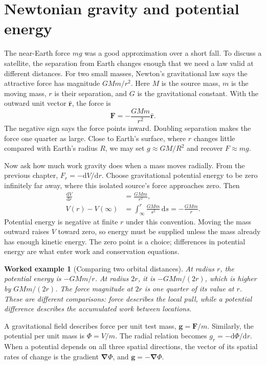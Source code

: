 \documentclass[11pt,oneside]{book}
\newcommand{\dd}{\mathrm{d}}
\newcommand{\vect}[1]{\boldsymbol{#1}}
\newcommand{\grad}{\boldsymbol{\nabla}}
\newcommand{\od}[2]{\frac{\dd #1}{\dd #2}}
\theoremstyle{reviewstyle}
\newtheorem{example}{Worked example}[chapter]
\begin{document}
\section{Newtonian gravity and potential energy}
The near-Earth force $mg$ was a good approximation over a short fall. To discuss a satellite, the separation from Earth changes enough that we need a law valid at different distances. For two small masses, Newton's gravitational law says the attractive force has magnitude $GMm/r^2$. Here $M$ is the source mass, $m$ is the moving mass, $r$ is their separation, and $G$ is the gravitational constant. With the outward unit vector $\hat{\vect r}$, the force is
\begin{equation}
\vect F=-\frac{GMm}{r^2}\hat{\vect r}.
\end{equation}
The negative sign says the force points inward. Doubling separation makes the force one quarter as large. Close to Earth's surface, where $r$ changes little compared with Earth's radius $R$, we may set $g\approx GM/R^2$ and recover $F\approx mg$.

Now ask how much work gravity does when a mass moves radially. From the previous chapter, $F_r=-\dd V/\dd r$. Choose gravitational potential energy to be zero infinitely far away, where this isolated source's force approaches zero. Then
\begin{align}
\od{V}{r}&=\frac{GMm}{r^2},\\
V(r)-V(\infty)&=\int_\infty^r\frac{GMm}{s^2}\,\dd s
=-\frac{GMm}{r}.
\end{align}
Potential energy is negative at finite $r$ under this convention. Moving the mass outward raises $V$ toward zero, so energy must be supplied unless the mass already has enough kinetic energy. The zero point is a choice; differences in potential energy are what enter work and conservation equations.

\begin{example}[Comparing two orbital distances]
At radius $r$, the potential energy is $-GMm/r$. At radius $2r$, it is $-GMm/(2r)$, which is higher by $GMm/(2r)$. The force magnitude at $2r$ is one quarter of its value at $r$. These are different comparisons: force describes the local pull, while a potential difference describes the accumulated work between locations.
\end{example}

A gravitational field describes force per unit test mass, $\vect g=\vect F/m$. Similarly, the potential per unit mass is $\Phi=V/m$. The radial relation becomes $g_r=-\dd\Phi/\dd r$. When a potential depends on all three spatial directions, the vector of its spatial rates of change is the gradient $\grad\Phi$, and $\vect g=-\grad\Phi$.
\end{document}
